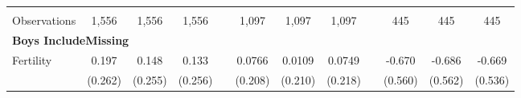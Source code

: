 \begin{landscape}
\begin{table}[htpb!]
\begin{center}
\begin{tabular}{lcccp{2mm}cccp{2mm}ccc}
\begin{footnotesize}\end{footnotesize}&\begin{footnotesize}\end{footnotesize}&\begin{footnotesize}\end{footnotesize}&\begin{footnotesize}\end{footnotesize}&\begin{footnotesize}\end{footnotesize}&\begin{footnotesize}\end{footnotesize}&\begin{footnotesize}\end{footnotesize}&\begin{footnotesize}\end{footnotesize}&\begin{footnotesize}\end{footnotesize}&\begin{footnotesize}\end{footnotesize}&\begin{footnotesize}\end{footnotesize}&\begin{footnotesize}\end{footnotesize}\\Observations&1,556&1,556&1,556&&1,097&1,097&1,097&&445&445&445\\
\multicolumn{12}{l}{\textbf{Boys IncludeMissing}}\\ 
Fertility&0.197&0.148&0.133&&0.0766&0.0109&0.0749&&-0.670&-0.686&-0.669\\
&(0.262)&(0.255)&(0.256)&&(0.208)&(0.210)&(0.218)&&(0.560)&(0.562)&(0.536)\\

\end{tabular}
\end{center}
\end{table}
\end{landscape}
